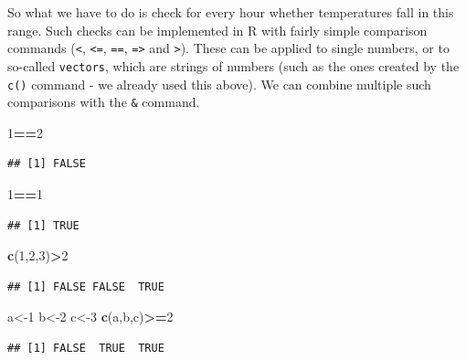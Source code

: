 \documentclass[
]{book}
\newenvironment{Shaded}{\begin{snugshade}}{\end{snugshade}}
\newcommand{\DecValTok}[1]{\textcolor[rgb]{0.00,0.00,0.81}{#1}}
\newcommand{\KeywordTok}[1]{\textcolor[rgb]{0.13,0.29,0.53}{\textbf{#1}}}
\newcommand{\NormalTok}[1]{#1}
\newcommand{\OperatorTok}[1]{\textcolor[rgb]{0.81,0.36,0.00}{\textbf{#1}}}
\begin{document}
So what we have to do is check for every hour whether temperatures fall in this range. Such checks can be implemented in R with fairly simple comparison commands (\texttt{\textless{}}, \texttt{\textless{}=}, \texttt{==}, \texttt{=\textgreater{}} and \texttt{\textgreater{}}). These can be applied to single numbers, or to so-called \texttt{vectors}, which are strings of numbers (such as the ones created by the \texttt{c()} command - we already used this above). We can combine multiple such comparisons with the \texttt{\&} command.

\begin{Shaded}
\begin{Highlighting}[]
\DecValTok{1}\OperatorTok{==}\DecValTok{2}
\end{Highlighting}
\end{Shaded}

\begin{verbatim}
## [1] FALSE
\end{verbatim}

\begin{Shaded}
\begin{Highlighting}[]
\DecValTok{1}\OperatorTok{==}\DecValTok{1}
\end{Highlighting}
\end{Shaded}

\begin{verbatim}
## [1] TRUE
\end{verbatim}

\begin{Shaded}
\begin{Highlighting}[]
\KeywordTok{c}\NormalTok{(}\DecValTok{1}\NormalTok{,}\DecValTok{2}\NormalTok{,}\DecValTok{3}\NormalTok{)}\OperatorTok{>}\DecValTok{2}
\end{Highlighting}
\end{Shaded}

\begin{verbatim}
## [1] FALSE FALSE  TRUE
\end{verbatim}

\begin{Shaded}
\begin{Highlighting}[]
\NormalTok{a<-}\DecValTok{1}
\NormalTok{b<-}\DecValTok{2}
\NormalTok{c<-}\DecValTok{3}
\KeywordTok{c}\NormalTok{(a,b,c)}\OperatorTok{>=}\DecValTok{2}
\end{Highlighting}
\end{Shaded}

\begin{verbatim}
## [1] FALSE  TRUE  TRUE
\end{verbatim}
\end{document}

